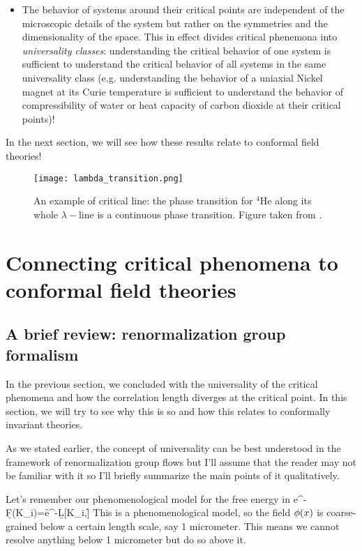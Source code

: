 \begin{itemize}
	\item The behavior of systems around their critical points are independent of the microscopic details of the system but rather on the symmetries and the dimensionality of the space. This in effect divides critical phenemona into \emph{universality classes}: understanding the critical behavior of one system is sufficient to understand the critical behavior of all systems in the same universality class (e.g. understanding the behavior of a uniaxial Nickel magnet at its Curie temperature is sufficient to understand the behavior of compressibility of water or heat capacity of carbon dioxide at their critical points)!
\end{itemize}
In the next section, we will see how these results relate to conformal field theories!

\begin{figure}
	\centering 
	\texttt{[image: lambda\_transition.png]}
	\caption[Example of  a critical line: $\lambda-$line of  $^4$He]{\label{fig: lambda line}An example of critical line: the phase transition for $^4$He along its whole $\lambda-$line is a continuous phase transition. Figure taken from \cite{Chester:2019ifh}.}
\end{figure}





\section{Connecting critical phenomena to conformal field theories}
\subsection{A brief review: renormalization group formalism}
\label{sec: review of RG}
In the previous section, we concluded with the universality of the critical phenomena and how the correlation length diverges at the critical point. In this section, we will try to see why this is so and how this relates to conformally invariant theories.

As we stated earlier, the concept of universality can be best understood in the framework of renormalization group flows but I'll assume that the reader may not be familiar with it so I'll briefly summarize the main points of it qualitatively.

Let's remember our phenomenological model for the free energy in 
\be 
e^{-\b F(K_i)}=\int \cD\f e^{-\b L[K_i,\f]}
\ee 
This is a phenomenological model, so the field $\phi(x)$ is coarse-grained below a certain length scale, say 1 micrometer. This means we cannot resolve anything below 1 micrometer but do so above it. 


